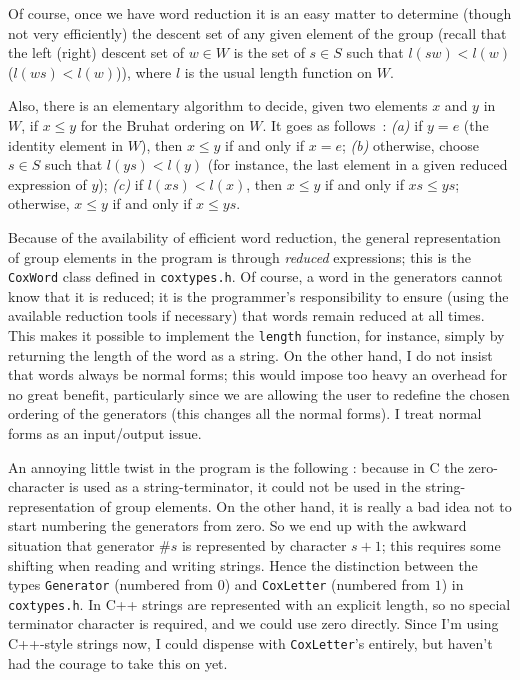 \documentclass[11pt]{article}
\begin{document}
Of course, once we have word reduction it is an easy matter to determine
(though not very efficiently) the descent set of any given element of
the group (recall that the left (right) descent set of $w\in W$ is the set
of $s\in S$ such that $l(sw)<l(w)$ ($l(ws)<l(w)$)), where $l$ is the usual
length function on $W$.

Also, there is an elementary algorithm to decide, given two elements $x$ and
$y$ in $W$, if $x\leq y$ for the Bruhat ordering on $W$. It goes as follows~:
{\it (a)} if $y=e$ (the identity element in $W$), then $x\leq y$ if and only if
$x=e$; {\it (b)} otherwise, choose $s\in S$ such that $l(ys)<l(y)$ (for
instance, the last element in a given reduced expression of $y$); {\it (c)}
if $l(xs)<l(x)$, then $x\leq y$ if and only if $xs\leq ys$; otherwise,
$x\leq y$ if and only if $x\leq ys$.

Because of the availability of efficient word reduction, the general
representation of group elements in the program is through {\em reduced}
expressions; this is the {\tt CoxWord} class defined in {\tt coxtypes.h}.
Of course, a word in the generators cannot know that it is reduced; it is
the programmer's responsibility to ensure (using the available reduction
tools if necessary) that words remain reduced at all times. This makes
it possible to implement the {\tt length} function, for instance, simply
by returning the length of the word as a string. On the other hand, I do
not insist that words always be normal forms; this would impose too heavy
an overhead for no great benefit, particularly since we are allowing the
user to redefine the chosen ordering of the generators (this changes all
the normal forms). I treat normal forms as an input/output issue.

An annoying little twist in the program is the following : because in C
the zero-character is used as a string-terminator, it could not be used in
the string-representation of group elements. On the other hand, it is really
a bad idea not to start numbering the generators from zero. So we end up
with the awkward situation that generator \#$s$ is represented by character
$s+1$; this requires some shifting when reading and writing strings. Hence
the distinction between the types {\tt Generator} (numbered from $0$) and
{\tt CoxLetter} (numbered from $1$) in {\tt coxtypes.h}. In C++ strings are
represented with an explicit length, so no special terminator character is
required, and we could use zero directly. Since I'm using C++-style strings
now, I could dispense with {\tt CoxLetter}'s entirely, but haven't had the
courage to take this on yet.
\end{document}
